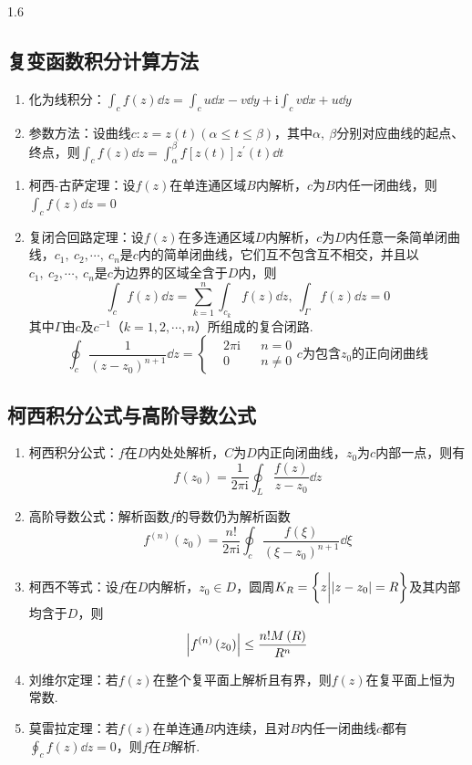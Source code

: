 \documentclass[lang=cn,10pt]{elegantbook}
\renewcommand{\i}{\mathrm{i}}
\begin{document}
\begin{spacing}{1.6}
\subsection{复变函数积分计算方法}
\begin{enumerate}
    \item 化为线积分：$\int_c{f\left(z\right)\dd z}=\int_c{u\dd x-v\dd y}+\i\int_c{v\dd x+u\dd y}$
    \item 参数方法：设曲线$c:z=z\left(t\right)(\alpha\leq t\leq\beta)$，其中$\alpha,\ \beta$分别对应曲线的起点、终点，则$\int_c{f\left(z\right)\dd z}=\int_{\alpha}^{\beta}{f\left[z\left(t\right)\right]z^{\prime}\left(t\right)\dd t}$
\end{enumerate}
\begin{theorem}
\begin{enumerate}
    \item 柯西-古萨定理：设$f\left(z\right)$在单连通区域$B$内解析，$c$为$B$内任一闭曲线，则$\int_c{f\left(z\right)\dd z}=0$
    \item 复闭合回路定理：设$f\left(z\right)$在多连通区域$D$内解析，$c$为$D$内任意一条简单闭曲线，$c_1,\ c_2,\cdots,\ c_n$是$c$内的简单闭曲线，它们互不包含互不相交，并且以$c_1,\ c_2,\cdots,\ c_n$是$c$为边界的区域全含于$D$内，则
    $$\int_c{f\left(z\right)\dd z}=\sum_{k=1}^{n}{\int_{c_k}{f\left(z\right)\dd z}},\ \int_{\Gamma}{f\left(z\right)\dd z}=0$$
    其中$\Gamma$由$c$及$c^{-1}$（$k=1,2,\cdots,n$）所组成的复合闭路.
    $$
    \oint_c{\frac{1}{\left(z-z_0\right)^{n+1}}\dd z}=
    \left\{
    \begin{aligned}
    &2\pi\i&&n=0\\
    &0&&n\neq 0
    \end{aligned}
    \right.c\mbox{为包含}z_0\mbox{的正向闭曲线}
    $$
\end{enumerate}
\end{theorem}
\subsection{柯西积分公式与高阶导数公式}
\begin{enumerate}
    \item 柯西积分公式：$f$在$D$内处处解析，$C$为$D$内正向闭曲线，$z_0$为$c$内部一点，则有
    $$f\left(z_0\right)=\frac{1}{2\pi\i}\oint_L{\frac{f\left(z\right)}{z-z_0}\dd z}$$
    \item 高阶导数公式：解析函数$f$的导数仍为解析函数
    $$f^{\left(n\right)}\left(z_0\right)=\frac{n!}{2\pi\i}\oint_c{\frac{f\left(\xi\right)}{\left(\xi-z_0\right)^{n+1}}\dd\xi}$$
    \item 柯西不等式：设$f$在$D$内解析，$z_0\in D$，圆周$K_R=\left\{z\bigg|\abs{z-z_0}=R\right\}$及其内部均含于$D$，则
    $$\abs{f^{\left(n\right)}\left(z_0\right)}\leq\frac{n!M\left(R\right)}{R^n}$$
    \item 刘维尔定理：若$f\left(z\right)$在整个复平面上解析且有界，则$f\left(z\right)$在复平面上恒为常数.
    \item 莫雷拉定理：若$f\left(z\right)$在单连通$B$内连续，且对$B$内任一闭曲线$c$都有$\oint_c{f\left(z\right)\dd z}=0$，则$f$在$B$解析.
\end{enumerate}

\end{spacing}
\end{document}
